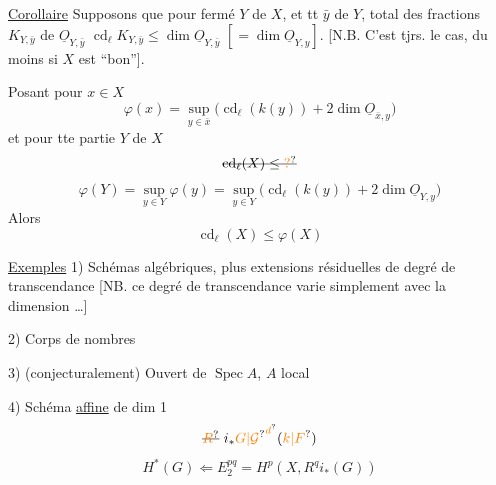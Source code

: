 \uline{Corollaire} Supposons que pour    fermé
 $Y$ de $X$, et tt   \uline{}
$\bar y$ de $Y$,   total des fractions $K_{Y,\bar y}$ de
$\underline O_{Y,\bar y}$   $\operatorname{cd}_{\ell}K_{Y,\bar y}\leq\dim\underline O_{Y,\bar y}$
$[=\dim\underline O_{Y,y}]$.  [N.B. C'est 
tjrs. le cas, du moins si $X$ est ``bon''].

Posant pour   $x\in X$
\[
\boxed{\varphi(x)=\sup_{y\in\bar x}\bigl(\operatorname{cd}_{\ell}(k(y))+2\dim\underline O_{\bar x,y}\bigr)}
\]
 et pour tte partie  $Y$ de $X$
\[
\deleted{\operatorname{cd}_{\ell}(X)\leq\unsure{?}}
\]
\[
\varphi(Y)=\sup_{y\in Y}\varphi(y)=\sup_{y\in Y}\bigl(\operatorname{cd}_{\ell}(k(y))+2\dim\underline O_{Y,y}\bigr)
\]
Alors
\[
\operatorname{cd}_{\ell}(X)\leq\varphi(X)
\]


\uline{Exemples} 1) Schémas algébriques, plus 
extensions résiduelles de degré de transcendance
 [NB. ce degré de transcendance varie
simplement avec la dimension \ldots]

2) Corps de nombres

3) (conjecturalement) Ouvert de $\operatorname{Spec} A$,
$A$  local

4) Schéma  \uline{affine} de dim 1
\[
\deleted{\unsure{R}}\ i_*{\unsure{G|\mathcal G}}^{\unsure{d}}(\unsure{k|F})
\]
\[
H^*(G)\Longleftarrow E_2^{pq}=H^p(X,R^qi_*(G))
\]

